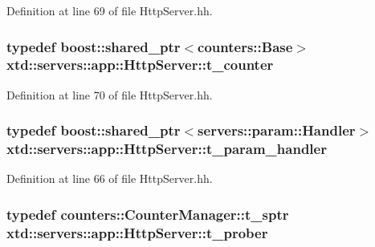 Definition at line 69 of file Http\-Server.\-hh.

\hypertarget{classxtd_1_1servers_1_1app_1_1HttpServer_aaef467afe1f5191f38758088615c09c0}{
\subsubsection[{t\-\_\-counter}]{\setlength{\rightskip}{0pt plus 5cm}typedef boost\-::shared\-\_\-ptr$<$counters\-::\-Base$>$ {\bf xtd\-::servers\-::app\-::\-Http\-Server\-::t\-\_\-counter}\hspace{0.3cm}{\ttfamily [protected]}}}\label{classxtd_1_1servers_1_1app_1_1HttpServer_aaef467afe1f5191f38758088615c09c0}


Definition at line 70 of file Http\-Server.\-hh.

\hypertarget{classxtd_1_1servers_1_1app_1_1HttpServer_a9704ed4f011ec3a7424da2f2229477e1}{
\subsubsection[{t\-\_\-param\-\_\-handler}]{\setlength{\rightskip}{0pt plus 5cm}typedef boost\-::shared\-\_\-ptr$<${\bf servers\-::param\-::\-Handler}$>$ {\bf xtd\-::servers\-::app\-::\-Http\-Server\-::t\-\_\-param\-\_\-handler}\hspace{0.3cm}{\ttfamily [protected]}}}\label{classxtd_1_1servers_1_1app_1_1HttpServer_a9704ed4f011ec3a7424da2f2229477e1}


Definition at line 66 of file Http\-Server.\-hh.

\hypertarget{classxtd_1_1servers_1_1app_1_1HttpServer_ace89439f838ede46ec55a6ec7cc27888}{
\subsubsection[{t\-\_\-prober}]{\setlength{\rightskip}{0pt plus 5cm}typedef counters\-::\-Counter\-Manager\-::t\-\_\-sptr {\bf xtd\-::servers\-::app\-::\-Http\-Server\-::t\-\_\-prober}\hspace{0.3cm}{\ttfamily [protected]}}}\label{classxtd_1_1servers_1_1app_1_1HttpServer_ace89439f838ede46ec55a6ec7cc27888}


